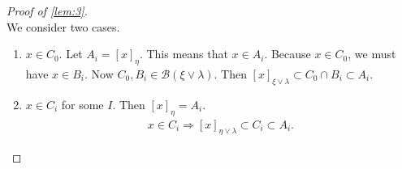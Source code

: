 \documentclass{article}
\begin{document}
\begin{proof}[Proof of \cref{lem:3}]
\begin{equation*}
  \end{equation*}
  We consider two cases.
  \begin{enumerate}
    \item $x \in C_0$. Let $A_i = [x]_\eta$.
      This means that $x \in A_i$. Because $x \in C_0$, we must have $x \in B_i$.
      Now $C_0, B_i \in \mathcal{B}(\xi \vee \lambda)$.
      Then $[x]_{\xi \vee \lambda} \subset C_0 \cap B_i \subset A_i$.
    \item $x \in C_i$ for some $I$.
    Then $[x]_\eta = A_i$.
    \begin{align*}
      x \in C_i \Rightarrow [x]_{\eta \vee \lambda} \subset C_i \subset A_i.
    \end{align*} \qedhere
  \end{enumerate}
\end{proof}
\end{document}
